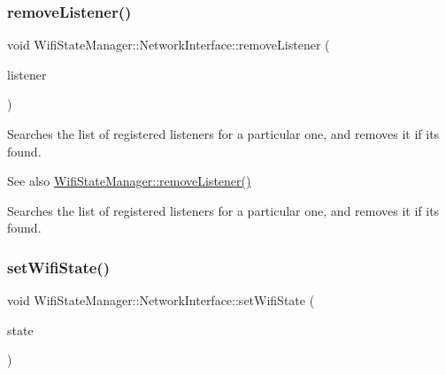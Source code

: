 \mbox{\label{classWifiStateManager_1_1NetworkInterface_a0019ba49d65a7d3351469768f4d44bdf}} 
\subsubsection{\texorpdfstring{remove\+Listener()}{removeListener()}}
{\footnotesize\ttfamily void Wifi\+State\+Manager\+::\+Network\+Interface\+::remove\+Listener (\begin{DoxyParamCaption}\item[{\mbox{\hyperlink{classWifiStateManager_1_1Listener}{Wifi\+State\+Manager\+::\+Listener}} $\ast$}]{listener }\end{DoxyParamCaption})}

Searches the list of registered listeners for a particular one, and removes it if it\textquotesingle{}s found. \begin{DoxySeeAlso}{See also}
\mbox{\hyperlink{classWifiStateManager_aad72d9ce616be466679c52188662d8bb}{Wifi\+State\+Manager\+::remove\+Listener()}}
\end{DoxySeeAlso}
Searches the list of registered listeners for a particular one, and removes it if it\textquotesingle{}s found. \mbox{\label{classWifiStateManager_1_1NetworkInterface_acbe026d2598cf8438ff470325a12cdc4}} 
\subsubsection{\texorpdfstring{set\+Wifi\+State()}{setWifiState()}}
{\footnotesize\ttfamily void Wifi\+State\+Manager\+::\+Network\+Interface\+::set\+Wifi\+State (\begin{DoxyParamCaption}\item[{\mbox{\hyperlink{classWifiStateManager_a1b2ed840606c57c43d4a147c96d43128}{Wifi\+State}}}]{state }\end{DoxyParamCaption})}

